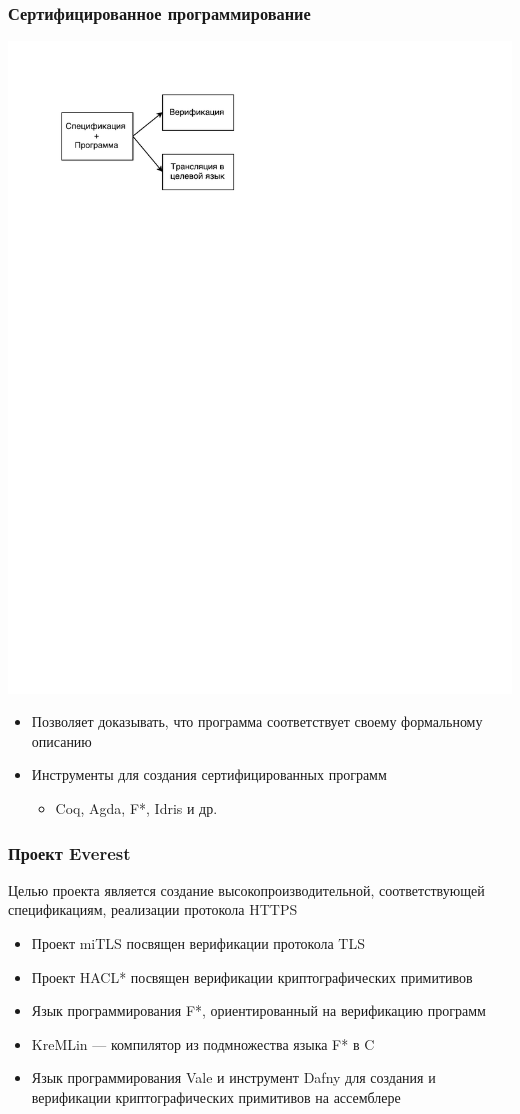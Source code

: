 \documentclass{beamer}
\begin{document}
\begin{frame}
\transwipe[direction=90]
\frametitle{Сертифицированное программирование}

\begin{center}
   {\includegraphics[width=.4\linewidth]{CertPr}}
\end{center}

\begin{itemize}
\item Позволяет доказывать, что программа соответствует своему формальному описанию
\item Инструменты для создания сертифицированных программ
	\begin{itemize}
	\item Coq, Agda, F*, Idris и др.
\end{itemize}
\end{itemize}

\end{frame}

\begin{frame}
\transwipe[direction=90]
\frametitle{Проект Everest}

Целью проекта является создание высокопроизводительной, соответствующей спецификациям, реализации протокола HTTPS

\begin{itemize}
\item Проект miTLS посвящен верификации протокола TLS
\item Проект HACL* посвящен верификации криптографических примитивов
\item Язык программирования F*, ориентированный на верификацию программ
\item KreMLin --- компилятор из подмножества языка F* в C
\item Язык программирования Vale и инструмент Dafny для создания и верификации криптографических примитивов на ассемблере
\end{itemize}

\end{frame}
\end{document}
